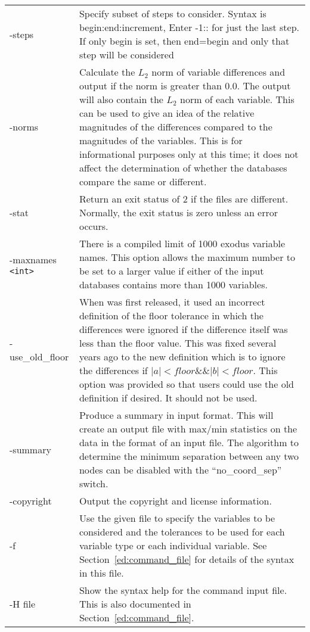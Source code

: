 \begin{longtable}{lp{4.0in}}
-steps {\tt <b:e:i>}& Specify subset of steps to consider. Syntax is begin:end:increment,
	Enter -1:: for just the last step. If only begin is set, then
	end=begin and only that step will be considered \\

-norms& Calculate the $L_2$ norm of variable differences and output if
	the norm is greater than 0.0. The output will also contain the
	$L_2$ norm of each variable.  This can be used to give an idea of
	the relative magnitudes of the differences compared to the magnitudes
	of the variables.  This is for informational purposes only at
	this time; it does not affect the determination of whether the
	databases compare the same or different.\\

-stat & Return an exit status of 2 if the files are different.  Normally,
        the exit status is zero unless an error occurs. \\

-maxnames {\tt <int>}& There is a compiled limit of 1000 exodus
	variable names. This option allows the maximum number to be
	set to a larger value if either of the input databases contains more
	than 1000 variables. \\

-use\_old\_floor& When \exodiff{} was first released, it used an
	incorrect definition of the floor tolerance in which the differences
	were ignored if the difference itself was less than the floor
	value. This was fixed several years ago to the new definition which is
	to ignore the differences if $|a| < floor \&\& |b| < floor$. This
	option was provided so that users could use the old definition
	if desired.  It should not be used. \\

-summary & Produce a summary in \exodiff{} input format.  This will
	create an output file with max/min statistics on the data in the
	format of an \exodiff{} input file.  The algorithm to determine
	the minimum separation between any two nodes can be disabled with
	the ``no\_coord\_sep'' switch. \\

-copyright & Output the copyright and license information. \\

-f {\tt <cmd file>} & Use the given file to specify the variables to
	be considered and the tolerances to be used for
	each variable type or each individual variable. See
	Section~\ref{ed:command_file} for details of the syntax in this file.\\

-H file & Show the syntax help for the command input file.  This is
	also documented in Section~\ref{ed:command_file}.\\
\end{longtable}

